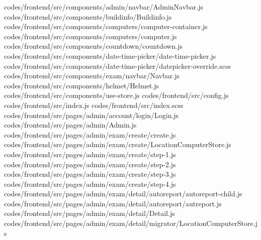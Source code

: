 codes/frontend/src/components/admin/navbar/AdminNavbar.js
codes/frontend/src/components/buildinfo/Buildinfo.js
codes/frontend/src/components/computers/computer-container.js
codes/frontend/src/components/computers/computer.js
codes/frontend/src/components/countdown/countdown.js
codes/frontend/src/components/date-time-picker/date-time-picker.js
codes/frontend/src/components/date-time-picker/datepicker-override.scss
codes/frontend/src/components/exam/navbar/Navbar.js
codes/frontend/src/components/helmet/Helmet.js
codes/frontend/src/components/use-store.js
codes/frontend/src/config.js
codes/frontend/src/index.js
codes/frontend/src/index.scss
codes/frontend/src/pages/admin/account/login/Login.js
codes/frontend/src/pages/admin/Admin.js
codes/frontend/src/pages/admin/exam/create/create.js
codes/frontend/src/pages/admin/exam/create/LocationComputerStore.js
codes/frontend/src/pages/admin/exam/create/step-1.js
codes/frontend/src/pages/admin/exam/create/step-2.js
codes/frontend/src/pages/admin/exam/create/step-3.js
codes/frontend/src/pages/admin/exam/create/step-4.js
codes/frontend/src/pages/admin/exam/detail/autoreport/autoreport-child.js
codes/frontend/src/pages/admin/exam/detail/autoreport/autreport.js
codes/frontend/src/pages/admin/exam/detail/Detail.js
codes/frontend/src/pages/admin/exam/detail/migrator/LocationComputerStore.js
